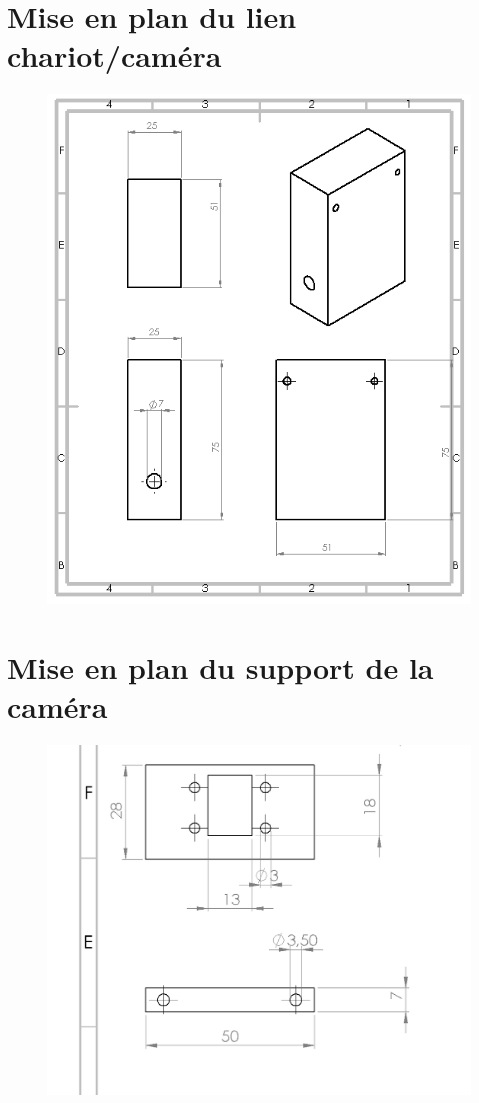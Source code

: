 \begin{changemargin}{-2cm}{-4cm}
\chapter*{Mise en plan du lien chariot/caméra}
\begin{figure}[!h]
 \center
 \includegraphics[scale=0.95]{../3DModels/camerachariot.png}
\end{figure}

\chapter*{Mise en plan du support de la caméra}
\begin{figure}[!h]
 \center
 \includegraphics[scale=0.95]{../3DModels/camera.png}
\end{figure}

\end{changemargin}